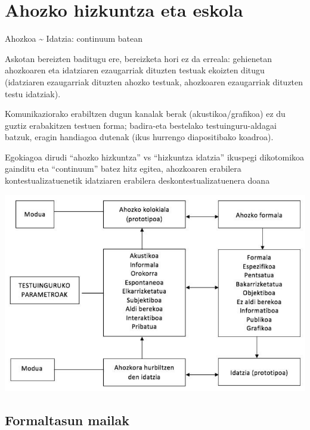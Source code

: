 \documentclass[
]{book}
\begin{document}
\hypertarget{ahozko-hizkuntza-eta-eskola}{%
\section{Ahozko hizkuntza eta eskola}\label{ahozko-hizkuntza-eta-eskola}}

Ahozkoa \textasciitilde{} Idatzia: continuum batean

Askotan bereizten baditugu ere, bereizketa hori ez da erreala: gehienetan ahozkoaren eta idatziaren ezaugarriak dituzten testuak ekoizten ditugu (idatziaren ezaugarriak dituzten ahozko testuak, ahozkoaren ezaugarriak dituzten testu idatziak).

Komunikaziorako erabiltzen dugun kanalak berak (akustikoa/grafikoa) ez du guztiz erabakitzen testuen forma; badira-eta bestelako testuinguru-aldagai batzuk, eragin handiagoa dutenak (ikus hurrengo diapositibako koadroa).

Egokiagoa dirudi ``ahozko hizkuntza'' vs ``hizkuntza idatzia'' ikuspegi dikotomikoa gainditu eta ``continuum'' batez hitz egitea, ahozkoaren erabilera kontestualizatuenetik idatziaren erabilera deskontestualizatuenera doana

\includegraphics{assets/5-2.png}

\hypertarget{formaltasun-mailak}{%
\subsection{Formaltasun mailak}\label{formaltasun-mailak}}
\end{document}
